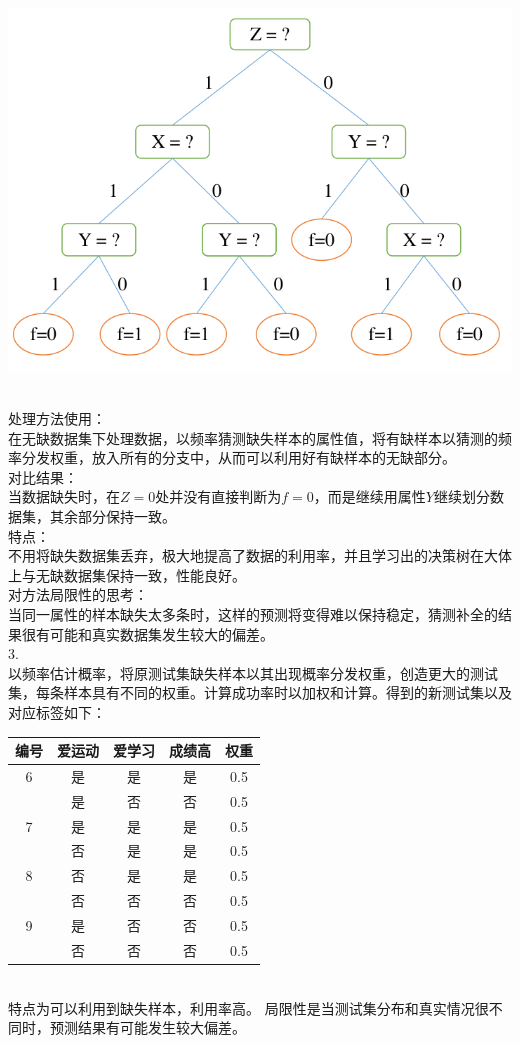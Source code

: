 \documentclass[answers]{exam}  %
\begin{document}
\begin{questions}
\begin{solution}
        \centerline{\includegraphics[width=0.9\linewidth]{4.2.png}}\\
        处理方法使用：\\
        在无缺数据集下处理数据，以频率猜测缺失样本的属性值，将有缺样本以猜测的频率分发权重，放入所有的分支中，从而可以利用好有缺样本的无缺部分。\\
        对比结果：\\
        当数据缺失时，在$Z=0$处并没有直接判断为$f=0$，而是继续用属性$Y$继续划分数据集，其余部分保持一致。\\
        特点：\\
        不用将缺失数据集丢弃，极大地提高了数据的利用率，并且学习出的决策树在大体上与无缺数据集保持一致，性能良好。\\
        对方法局限性的思考：\\
        当同一属性的样本缺失太多条时，这样的预测将变得难以保持稳定，猜测补全的结果很有可能和真实数据集发生较大的偏差。
        \\3.\\
        以频率估计概率，将原测试集缺失样本以其出现概率分发权重，创造更大的测试集，每条样本具有不同的权重。计算成功率时以加权和计算。得到的新测试集以及对应标签如下：
        \\\begin{tabular}{ccccc}
            \hline 编号 & 爱运动 & 爱学习 & 成绩高 & 权重\\
            \hline 
            6 & 是 & 是 & 是 &0.5\\
              & 是 & 否 & 否 &0.5\\
            7 & 是 & 是 & 是 &0.5\\
              & 否 & 是 & 是 &0.5\\
            8 & 否 & 是 & 是 &0.5\\
              & 否 & 否 & 否 &0.5\\
            9 & 是 & 否 & 否 &0.5\\
              & 否 & 否 & 否 &0.5\\
            \hline
        \end{tabular}\\
        特点为可以利用到缺失样本，利用率高。
        局限性是当测试集分布和真实情况很不同时，预测结果有可能发生较大偏差。
	\end{solution}



\end{questions}
\end{document}
